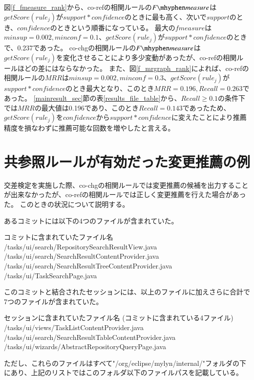 \documentclass[a4paper]{jsbook}
\newcommand{\minconf}{mincon\!f}
\newcommand{\confidence}{con\!f\!idence}
\newcommand{\fmeasure}{F\mhyphen measure}
\newcommand{\getScore}{getS\!core}
\begin{document}
図\ref{f_fmeasure_rank}から、co-refの相関ルールの$\fmeasure$は$\getScore(rule_j)$が$support*\confidence$のときに最も高く、次いで$support$のとき、$\confidence$のときという順番になっている。
最大の$fmeasure$は$minsup=0.002,\minconf=0.1$、$\getScore(rule_j)$が$support*\confidence$のときで、0.237であった。
co-chgの相関ルールの$\fmeasure$は$\getScore(rule_j)$を変化させることにより多少変動があったが、co-refの相関ルールほどの差にはならなかった。
また、図\ref{f_mrgraph_rank}によれば、co-refの相関ルールの$MRR$は$minsup=0.002,\minconf=0.3$、$\getScore(rule_j)$が$support*\confidence$のとき最大となり、このとき$MRR=0.196,Recall=0.263$であった。
\ref{mainresult_sec}節の表\ref{results_file_table}から、$Recall\geq 0.1$の条件下では$MRR$の最大値は0.196であり、このとき$Recall=0.143$であったため、$\getScore(rule_j)$を$\confidence$から$support*\confidence$に変えたことにより推薦精度を損なわずに推薦可能な回数を増やしたと言える。


\section{共参照ルールが有効だった変更推薦の例}
交差検定を実施した際、co-chgの相関ルールでは変更推薦の候補を出力することが出来なかったが、co-refの相関ルールでは正しく変更推薦を行えた場合があった。
このときの状況について説明する。

あるコミットには以下の4つのファイルが含まれていた。
\begin{itembox}{コミットに含まれていたファイル名}
  /tasks/ui/search/RepositorySearchResultView.java \\
  /tasks/ui/search/SearchResultContentProvider.java \\
  /tasks/ui/search/SearchResultTreeContentProvider.java \\
  /tasks/ui/TaskSearchPage.java
\end{itembox}
このコミットと結合されたセッションには、以上のファイルに加えさらに合計で7つのファイルが含まれていた。
\begin{itembox}{セッションに含まれていたファイル名}
  (コミットに含まれている4ファイル)\\
  /tasks/ui/views/TaskListContentProvider.java \\
  /tasks/ui/search/SearchResultTableContentProvider.java\\
  /tasks/ui/wizards/AbstractRepositoryQueryPage.java
\end{itembox}
ただし、これらのファイルはすべて"/org/eclipse/mylyn/internal/"フォルダの下にあり、上記のリストではこのフォルダ以下のファイルパスを記載している。
\end{document}
